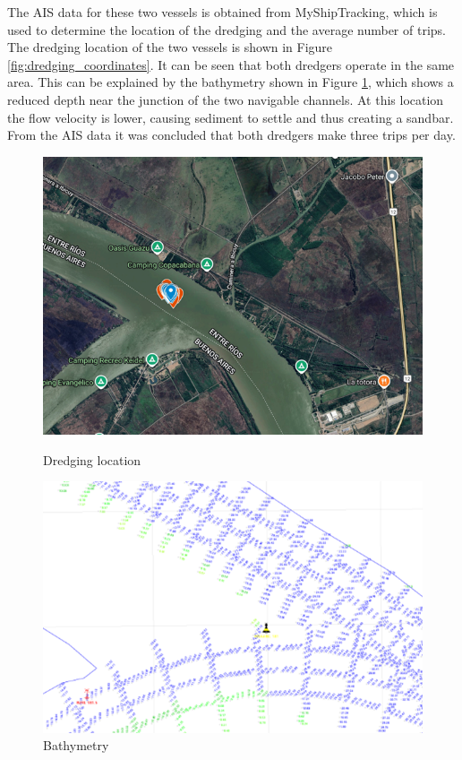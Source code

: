 The AIS data for these two vessels is obtained from MyShipTracking, which is used to determine the location of the dredging and the average number of trips. The dredging location of the two vessels is shown in Figure \ref{fig:dredging_coordinates}. It can be seen that both dredgers operate in the same area. This can be explained by the bathymetry shown in Figure \ref{fig:bathymetry}, which shows a reduced depth near the junction of the two navigable channels. At this location the flow velocity is lower, causing sediment to settle and thus creating a sandbar. From the AIS data it was concluded that both dredgers make three trips per day.

\begin{figure}[H]
    \centering
    \begin{minipage}{0.48\textwidth}
        \centering
        \includegraphics[width=\linewidth]{figures/ch5/Dredging_coordinates.png}
        \caption{Dredging location}
        \label{fig:dredging_coordinates}
    \end{minipage}\hfill
    \begin{minipage}{0.48\textwidth}
        \centering
        \includegraphics[width=\linewidth]{figures/ch5/Bathymetry.png}
        \caption{Bathymetry}
        \label{fig:bathymetry}
    \end{minipage}
\end{figure}

